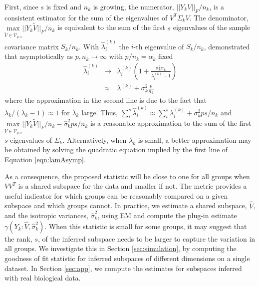 \documentclass[12pt]{article}
\begin{document}
First, since $s$ is fixed and $n_k$ is growing, the numerator,
$||Y_kV||_F/n_k$, is a consistent estimator for the sum of the
eigenvalues of $V^T\Sigma_kV$.  The denominator,
$\underset{\widetilde{V} \in \mathcal{V}_{p,
    s}}{\text{max}}||Y_k\widetilde{V}||_F/n_k$
is equivalent to the sum of the first $s$ eigenvalues of the sample
covariance matrix $S_k/n_k$.  With $\hat{\lambda}^{(k)}_i$ the
$i$-th eigenvalue of $S_k/n_k$, \citet{Baik2006} demonstrated that
asymptotically as $p, n_k \rightarrow \infty$ with $p/n_k = \alpha_k$
fixed
%
\begin{eqnarray}
\nonumber \hat{\lambda}^{(k)}_i &\rightarrow& \lambda^{(k)}_i\left(1 +
                                    \frac{\sigma_k^2\alpha_k}{\lambda^{(k)}_i
                                    - 1}\right)\\
& \approx& \lambda^{(k)} + \sigma^2_k\frac{p}{n_k}
\label{eqn:lamAsymp}
\end{eqnarray}
%
\noindent where the approximation in the second line is due to the
fact that $\lambda_k/(\lambda_k - 1) \approx 1$ for $\lambda_k$ large.
Thus,
$\sum_i^s \hat{\lambda}^{(k)}_i \approx \sum_i^s \lambda^{(k)}_i +
\sigma_k^2ps/n_k$
and
$\underset{\widetilde{V} \in \mathcal{V}_{p, s}}{\text{max}}
||Y_k\widetilde{V}||_F/n_k - \hat{\sigma}_k^2ps/n_k$
is a reasonable approximation to the sum of the first $s$ eigenvalues
of $\Sigma_k$.  Alternatively, when $\lambda_k$ is small, a better
approximation may be obtained by solving the quadratic equation
implied by the first line of Equation \ref{eqn:lamAsymp}.

As a consequence, the proposed statistic will be close to one for all
groups when $VV^T$ is a shared subspace for the data and smaller if
not.  The metric provides a useful indicator for which groups can be
reasonably compared on a given subspace and which groups cannot.  In
practice, we estimate a shared subspace, $\hat{V}$, and the isotropic
variances, $\hat{\sigma}_k^2$, using EM and compute the plug-in
estimate $\gamma(Y_k: \hat{V}, \hat{\sigma}_k^2)$.  When this
statistic is small for some groups, it may suggest that the rank, $s$,
of the inferred subspace needs to be larger to capture the variation
in all groups. We investigate this in Section \ref{sec:simulation}, by
computing the goodness of fit statistic for inferred subspaces of
different dimensions on a single dataset. In Section \ref{sec:app}, we
compute the estimates for subspaces inferred with real biological
data.

\end{document}
